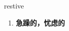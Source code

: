 
\begin{frame}
{\huge restive}
\begin{center}
\begin{enumerate}\Large
  \item \textbf{急躁的，忧虑的}
\end{enumerate}
\end{center}
\end{frame}
